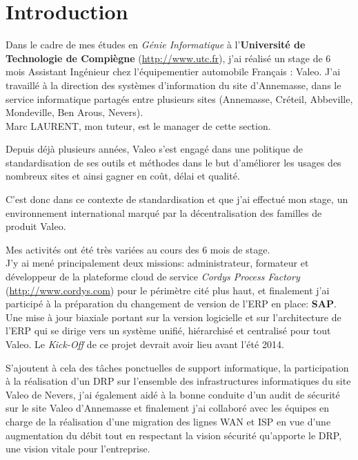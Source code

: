 \chapter*{Introduction}

Dans le cadre de mes études en \emph{Génie Informatique} à l'\textbf{Université de Technologie de Compiègne} (\url{http://www.utc.fr}), j'ai réalisé un stage de 6 mois Assistant Ingénieur chez l'équipementier automobile Français : Valeo. J'ai travaillé à la direction des systèmes d'information du site d'Annemasse, dans le service informatique partagés entre plusieurs sites (Annemasse, Créteil, Abbeville, Mondeville, Ben Arous, Nevers). \\
Marc LAURENT, mon tuteur, est le manager de cette section.

Depuis déjà plusieurs années, Valeo s'est engagé dans une politique de standardisation de ses outils et méthodes dans le but d'améliorer les usages des nombreux sites et ainsi gagner en coût, délai et qualité.

C'est donc dans ce contexte de standardisation et que j'ai effectué mon stage, un environnement international marqué par la décentralisation des familles de produit Valeo. 

Mes activités ont été très variées au cours des 6 mois de stage. \\
J'y ai mené principalement deux missions: administrateur, formateur et développeur de la plateforme cloud de service \textit{Cordys Process Factory} (\url{http://www.cordys.com})  pour le périmètre cité plus haut, et finalement j'ai participé à la préparation du changement de version de l'ERP en place: \textbf{SAP}. Une mise à jour biaxiale portant sur la version logicielle et sur l'architecture de l'ERP qui se dirige vers un système unifié, hiérarchisé et centralisé pour tout Valeo. Le\textit{ Kick-Off }de ce projet devrait avoir lieu avant l'été 2014.

S'ajoutent à cela des tâches ponctuelles de support informatique, la participation à la réalisation d'un DRP sur l'ensemble des infrastructures informatiques du site Valeo de Nevers, j'ai également aidé à la bonne conduite d'un audit de sécurité sur le site Valeo d'Annemasse et finalement j'ai collaboré avec les équipes en charge de la réalisation d'une migration des lignes WAN et ISP en vue d'une augmentation du débit  tout en respectant la vision sécurité qu'apporte le DRP, une vision vitale pour l'entreprise. 

